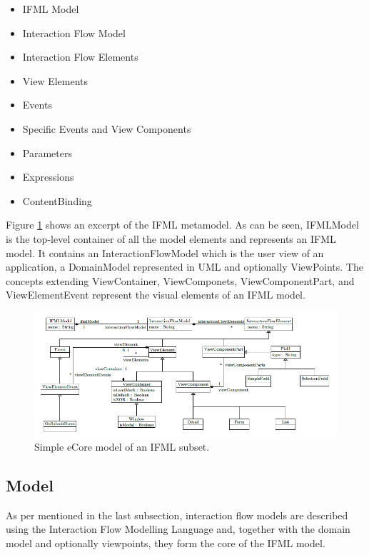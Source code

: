 \begin{itemize}
  \item IFML Model
  \item Interaction Flow Model
  \item Interaction Flow Elements
  \item View Elements
  \item Events
  \item Specific Events and View Components
  \item Parameters
  \item Expressions
  \item ContentBinding
\end{itemize}

Figure \ref{fig:simple-ifml-core-model} shows an excerpt of the IFML metamodel. As can be seen, IFMLModel is the top-level container of all the model elements and represents an IFML model. It contains an InteractionFlowModel which is the user view of an application, a DomainModel represented in UML and optionally ViewPoints. The concepts extending ViewContainer, ViewComponets, ViewComponentPart, and ViewElementEvent represent the visual elements of an IFML model.

\vspace{0.5cm}
\begin{figure}[H]
  \centering
    \includegraphics[width=12cm]{images/diagrams/ifml-metamodel.png}
  \caption{Simple eCore model of an IFML subset.}
  \label{fig:simple-ifml-core-model}
\end{figure}
\vspace{0.5cm}

\subsection{Model}

As per mentioned in the last subsection, interaction flow models are described using the Interaction Flow Modelling Language and, together with the domain model and optionally viewpoints, they form the core of the IFML model.

